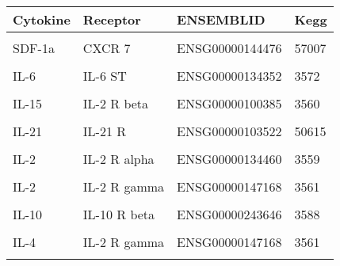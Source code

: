 \documentclass[11pt, a4paper, twosided]{book}
\begin{document}
\begin{table}
\centering\begingroup\fontsize{10}{12}\selectfont
\begin{tabular}{l|l|l|l}
\hline
Cytokine & Receptor & ENSEMBLID & Kegg\\
\hline
\cellcolor[HTML]{E2E868}{SDF-1a} & \cellcolor[HTML]{E2E868}{CXCR 4} & \cellcolor[HTML]{E2E868}{ENSG00000121966} & \cellcolor[HTML]{E2E868}{7852}\\
\hline
SDF-1a & CXCR 7 & ENSG00000144476 & 57007\\
\hline
\cellcolor[HTML]{E2E868}{IL-6} & \cellcolor[HTML]{E2E868}{IL-6 R} & \cellcolor[HTML]{E2E868}{ENSG00000160712} & \cellcolor[HTML]{E2E868}{3570}\\
\hline
IL-6 & IL-6 ST & ENSG00000134352 & 3572\\
\hline
\cellcolor[HTML]{E2E868}{IL-15} & \cellcolor[HTML]{E2E868}{IL-15 R alpha} & \cellcolor[HTML]{E2E868}{ENSG00000134470} & \cellcolor[HTML]{E2E868}{3601}\\
\hline
IL-15 & IL-2 R beta & ENSG00000100385 & 3560\\
\hline
\cellcolor[HTML]{E2E868}{IL-15} & \cellcolor[HTML]{E2E868}{IL-2 R gamma} & \cellcolor[HTML]{E2E868}{ENSG00000147168} & \cellcolor[HTML]{E2E868}{3561}\\
\hline
IL-21 & IL-21 R & ENSG00000103522 & 50615\\
\hline
\cellcolor[HTML]{E2E868}{IL-21} & \cellcolor[HTML]{E2E868}{IL-21 R gamma} & \cellcolor[HTML]{E2E868}{ENSG00000147168} & \cellcolor[HTML]{E2E868}{3561}\\
\hline
IL-2 & IL-2 R alpha & ENSG00000134460 & 3559\\
\hline
\cellcolor[HTML]{E2E868}{IL-2} & \cellcolor[HTML]{E2E868}{IL-2 R beta} & \cellcolor[HTML]{E2E868}{ENSG00000100385} & \cellcolor[HTML]{E2E868}{3560}\\
\hline
IL-2 & IL-2 R gamma & ENSG00000147168 & 3561\\
\hline
\cellcolor[HTML]{E2E868}{IL-10} & \cellcolor[HTML]{E2E868}{IL-10 R alpha} & \cellcolor[HTML]{E2E868}{ENSG00000110324} & \cellcolor[HTML]{E2E868}{3587}\\
\hline
IL-10 & IL-10 R beta & ENSG00000243646 & 3588\\
\hline
\cellcolor[HTML]{E2E868}{IL-4} & \cellcolor[HTML]{E2E868}{IL-4 R} & \cellcolor[HTML]{E2E868}{ENSG00000077238} & \cellcolor[HTML]{E2E868}{3566}\\
\hline
IL-4 & IL-2 R gamma & ENSG00000147168 & 3561\\
\hline
\cellcolor[HTML]{E2E868}{IL-4} & \cellcolor[HTML]{E2E868}{IL-13 R A1} & \cellcolor[HTML]{E2E868}{ENSG00000131724} & \cellcolor[HTML]{E2E868}{3597}\\

\end{tabular}
\end{table}
\end{document}
